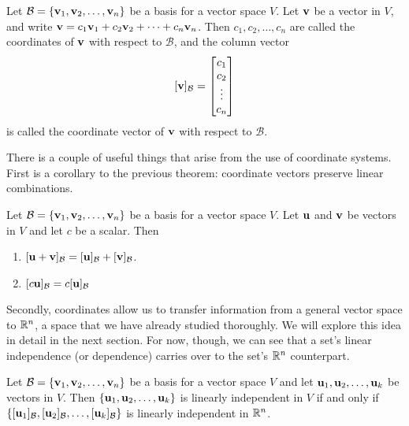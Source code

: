 \documentclass[../m73main.tex]{chapters}
\begin{document}
\begin{definition}
	Let $\mathcal{B} = \{\mathbf{v}_1, \mathbf{v}_2, \ldots, \mathbf{v}_n\}$ be a basis for a vector space $V$.
	Let $\mathbf{v}$ be a vector in $V$, and write $\mathbf{v} = c_1 \mathbf{v}_1 + c_2 \mathbf{v}_2 + \cdots + c_n \mathbf{v}_n$.
	Then $c_1, c_2, \ldots, c_n$ are called the coordinates of $\mathbf{v}$ with respect to $\mathcal{B}$, and the column vector
	\[ [\mathbf{v}]_{\mathcal{B}} = \begin{bmatrix} c_1 \\ c_2 \\ \vdots \\ c_n \end{bmatrix} \]
	is called the coordinate vector of $\mathbf{v}$ with respect to $\mathcal{B}$.
\end{definition}

There is a couple of useful things that arise from the use of coordinate systems.
First is a corollary to the previous theorem: coordinate vectors preserve linear combinations.

\begin{theorem}
	Let $\mathcal{B} = \{\mathbf{v}_1, \mathbf{v}_2, \ldots, \mathbf{v}_n\}$ be a basis for a vector space $V$.
	Let $\mathbf{u}$ and $\mathbf{v}$ be vectors in $V$ and let $c$ be a scalar.
	Then
	\begin{enumerate}[label=(\alph*)]
		\item $[\mathbf{u} + \mathbf{v}]_{\mathcal{B}} = [\mathbf{u}]_{\mathcal{B}} + [\mathbf{v}]_{\mathcal{B}}$.
		\item $[c \mathbf{u}]_{\mathcal{B}} = c[\mathbf{u}]_{\mathcal{B}}$
	\end{enumerate}
\end{theorem}

Secondly, coordinates allow us to transfer information from a general vector space to $\mathbb{R}^n$, a space that we have already studied thoroughly.
We will explore this idea in detail in the next section.
For now, though, we can see that a set's linear independence (or dependence) carries over to the set's $\mathbb{R}^n$ counterpart.

\begin{theorem}
	Let $\mathcal{B} = \{\mathbf{v}_1, \mathbf{v}_2, \ldots, \mathbf{v}_n\}$ be a basis for a vector space $V$ and let $\mathbf{u}_1, \mathbf{u}_2, \ldots, \mathbf{u}_k$ be vectors in $V$.
	Then $\{\mathbf{u}_1, \mathbf{u}_2, \ldots, \mathbf{u}_k	\}$ is linearly independent in $V$ if and only if $\{[\mathbf{u}_1]_{\mathcal{B}}, [\mathbf{u}_2]_{\mathcal{B}}, \ldots, [\mathbf{u}_k]_{\mathcal{B}}\}$ is linearly independent in $\mathbb{R}^n$.
\end{theorem}
\end{document}

